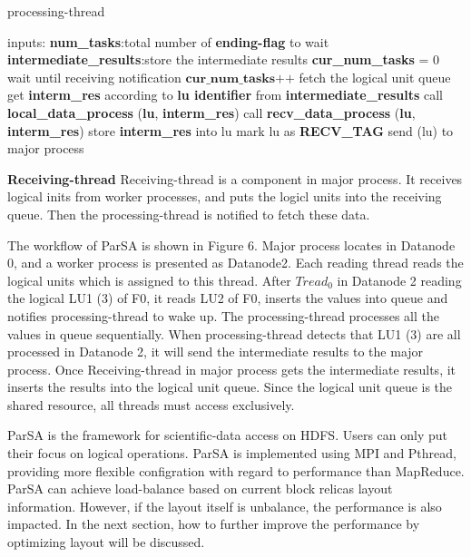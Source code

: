 \documentclass[preprint,12pt]{elsarticle}
\begin{document}
\begin{algorithm}[htb]
\caption{processing-thread} 
\label{alg:processing-thread}
\begin{algorithmic}
\STATE inputs:
\STATE \textbf{num\_tasks}:total number of \textbf{ending-flag} to wait
\STATE \textbf{intermediate\_results}:store the intermediate results
\newline
\STATE \textbf{cur\_num\_tasks} = 0
\STATE wait until receiving notification
\STATE $\textbf{cur\_num\_tasks++}$
\STATE fetch the logical unit queue
\STATE get \textbf{interm\_res} according to \textbf{lu identifier} from \textbf{intermediate\_results}
\STATE call \textbf{local\_data\_process} (\textbf{lu}, \textbf{interm\_res})
\ENDIF
{}
\STATE call \textbf{recv\_data\_process} (\textbf{lu}, \textbf{interm\_res}) 
\ENDIF
{}
\STATE store \textbf{interm\_res} into lu
\STATE mark lu as \textbf{RECV\_TAG}
\STATE send (lu) to major process
\ENDIF
\ENDIF
\ENDFOR
\ENDIF
\ENDWHILE
\end{algorithmic}
\end{algorithm}

\textbf{Receiving-thread} Receiving-thread is a component in major process. It receives logical inits from worker processes, and
puts the logicl units into the receiving queue. Then the processing-thread is notified to fetch these data. \par
The workflow of ParSA is shown in Figure 6. Major process locates in Datanode 0, and a worker process is presented as Datanode2. Each 
reading thread reads the logical units which is assigned to this thread. After $Tread_0$ in Datanode 2 reading the logical LU1 (3) of F0,
it reads LU2 of F0, inserts the values into queue and notifies processing-thread to wake up. The processing-thread processes all the values 
in queue sequentially. When processing-thread detects that LU1 (3) are all processed in Datanode 2, it will send the intermediate results 
to the major process. Once Receiving-thread in major process gets the intermediate results, it inserts the results into the logical unit 
queue. Since the logical unit queue is the shared resource, all threads must access exclusively. \par
ParSA is the framework for scientific-data access on HDFS. Users can only put their focus on logical operations.  ParSA is implemented 
using MPI and Pthread, providing more flexible configration with regard to performance than MapReduce. ParSA can achieve load-balance based
on current block relicas layout information. However, if the layout itself is unbalance, the performance is also impacted. In the next 
section, how to further improve the performance by optimizing layout will be discussed.
\end{document}
